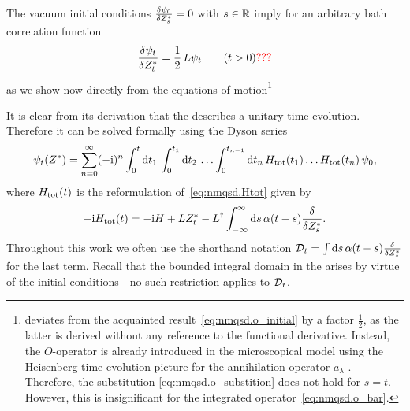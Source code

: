 The vacuum initial conditions $\frac{\delta \psi_0}{\delta {Z}^*_s} = 0$ with $s \in \mathbb{R}$ imply for an arbitrary bath correlation function
\begin{equation}
  \frac{\delta \psi_t}{\delta {Z}^*_t} = \frac{1}{2} \, L \psi_t \qquad (t > 0) {\color{red}???}
  \label{eq:nmqsd.deriv_psit}
\end{equation}
as we show now directly from the equations of motion\footnote{%
   deviates from the acquainted result~\ref{eq:nmqsd.o_initial} by a factor $\frac{1}{2}$, as the latter is derived without any reference to the functional derivative.
  Instead, the $O$-operator is already introduced in the microscopical model using the Heisenberg time evolution picture for the annihilation operator $a_\lambda$ \cite{St01_habil}.
  Therefore, the substitution \autoref{eq:nmqsd.o_substition} does not hold for $s = t$.
  However, this is insignificant for the integrated operator~\ref{eq:nmqsd.o_bar}.
}

It is clear from its derivation that the \NMSSE describes a unitary time evolution.
Therefore it can be solved formally using the Dyson series
\begin{equation}
  \psi_t(\ZZ) = \sum_{n=0}^\infty (-\ii)^n \intl{0}{t}{t_1} \intl{0}{t_1}{t_2} \dots \intl{0}{t_{n-1}}{t_n}  \Htot(t_1) \dots \Htot(t_n) \, \psi_0,
  \label{eq:nmqsd.dyson}
\end{equation}
where $H_\mathrm{tot}(t)$ is the reformulation of~\ref{eq:nmqsd.Htot} given by
\begin{equation*}
  -\mathrm{i} H_\mathrm{tot}(t) = -\mathrm{i} H + L {Z}^*_t - L^\dagger \int_{-\infty}^{\infty}\mathrm{d}s\, \alpha(t-s) \frac{\delta}{\delta {Z}^*_s}.
\end{equation*}
Throughout this work we often use the shorthand notation $\mathcal{D}_t = \int\mathrm{d}s \, \alpha(t-s) \frac{\delta}{\delta {Z}^*_s}$ for the last term.
Recall that the bounded integral domain in the \NMSSE arises by virtue of the initial conditions---no such restriction applies to $\mathcal{D}_t$.

